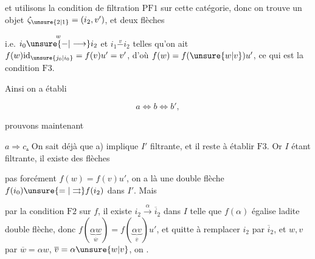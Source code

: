 et utilisons la condition de filtration $\mathrm{PF}1$ sur cette catégorie, donc on trouve un objet $\zeta_{\unsure{2|1}}=(i_2,v')$, et deux flèches 


i.e. $i_0\overset{w}{\unsure{\mathbin{-}|\longrightarrow}}i_2$ et $i_1\overset{v}{\mathbin{-}}i_2$ telles qu'on ait $f(w)\mathrm{id}_{\unsure{j_0|i_0}}=f(v)u'=v'$, d'où $f(w)=f(\unsure{w|v})u'$, ce qui est la condition $\mathrm{F}3$.

 Ainsi on a établi

\[a\Leftrightarrow b\Leftrightarrow b',\]

prouvons maintenant

\uline{$a\Rightarrow c$.} On sait déjà que a) implique $I'$ filtrante, et il reste à établir $\mathrm{F}3$.  Or $I$ étant filtrante, il existe  des flèches




 pas forcément $f(w)=f(v)u'$, on a là une double flèche  $f(i_0)\unsure{=|\rightrightarrows}f(i_2)$ dans $I'$. Mais


par la condition $\mathrm{F}2$ sur $f$, il existe $i_2\xrightarrow{\alpha}\overline{i}_2$ dans $I$ telle que $f(\alpha)$ égalise ladite double flèche, donc $f(\underbrace{\alpha w}_{\overline{w}})=f(\underbrace{\alpha v}_{\overline{v}})u'$, et quitte à remplacer $i_2$ par $\overline{i}_2$, et  $w,v$ par $\overline{w}=\alpha w$, $\overline{v}=\alpha\unsure{w|v}$, on .

